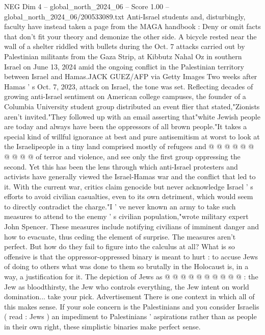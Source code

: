 \begin{textsample}{NEG Dim 4 – global\_north\_2024\_06 – Score 1.00 – global\_north\_2024\_06/200533089.txt}  \label{ex:f4_neg_320}
Anti-Israel students and, disturbingly, faculty have instead taken a page from the MAGA handbook : Deny or omit facts that don't fit your theory and demonize the other side.
A bicycle rested near the wall of a shelter riddled with bullets during the Oct. 7 attacks carried out by Palestinian militants from the Gaza Strip, at Kibbutz Nahal Oz in southern Israel on June 13, 2024 amid the ongoing conflict in the Palestinian territory between Israel and Hamas.JACK GUEZ/AFP via Getty Images Two weeks after Hamas ' s Oct. 7, 2023, attack on Israel, the tone was set.
Reflecting decades of growing anti-Israel sentiment on American college campuses, the founder of a Columbia University student group distributed an event flier that stated,"Zionists aren't invited."They followed up with an email asserting that"white Jewish people are today and always have been the oppressors of all brown people."It takes a special kind of willful ignorance at best and pure antisemitism at worst to look at the Israelipeople in a tiny land comprised mostly of refugees and @ @ @ @ @ @ @ @ @ @ of terror and violence, and see only the first group oppressing the second.
Yet this has been the lens through which anti-Israel protesters and activists have generally viewed the Israel-Hamas war and the conflict that led to it.
With the current war, critics claim genocide but never acknowledge Israel ' s efforts to avoid civilian casualties, even to its own detriment, which would seem to directly contradict the charge."I ' ve never known an army to take such measures to attend to the enemy ' s civilian population,"wrote military expert John Spencer.
These measures include notifying civilians of imminent danger and how to evacuate, thus ceding the element of surprise.
The measures aren't perfect.
But how do they fail to figure into the calculus at all?
What is so offensive is that the oppressor-oppressed binary is meant to hurt : to accuse Jews of doing to others what was done to them so brutally in the Holocaust is, in a way, a justification for it.
The depiction of Jews as @ @ @ @ @ @ @ @ @ @ : the Jew as bloodthirsty, the Jew who controls everything, the Jew intent on world domination... take your pick.
Advertisement There is one context in which all of this makes sense.
If your sole concern is the Palestinians and you consider Israelis ( read : Jews ) an impediment to Palestinians ' aspirations rather than as people in their own right, these simplistic binaries make perfect sense.

\end{textsample}
